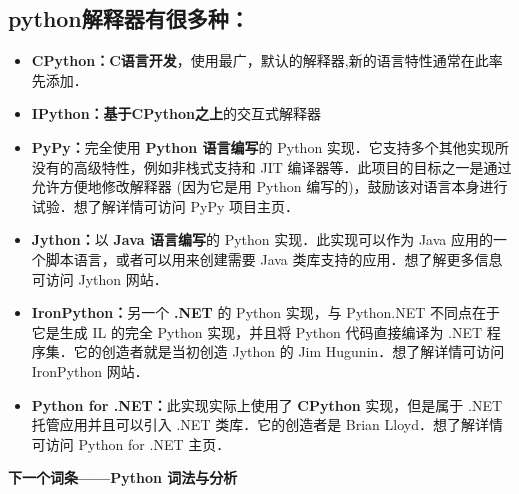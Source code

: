 \subsection{python解释器有很多种：}

\begin{itemize}
\item \textbf{CPython：}\textbf{C语言开发}，使用最广，默认的解释器,新的语言特性通常在此率先添加．

\item \textbf{IPython：}\textbf{基于CPython之上}的交互式解释器

\item \textbf{PyPy：}完全使用 \textbf{Python 语言编写}的 Python 实现．它支持多个其他实现所没有的高级特性，例如非栈式支持和 JIT 编译器等．此项目的目标之一是通过允许方便地修改解释器 (因为它是用 Python 编写的)，鼓励该对语言本身进行试验．想了解详情可访问 PyPy 项目主页．

\item \textbf{Jython：}以 \textbf{Java 语言编写}的 Python 实现．此实现可以作为 Java 应用的一个脚本语言，或者可以用来创建需要 Java 类库支持的应用．想了解更多信息可访问 Jython 网站．

\item \textbf{IronPython：}另一个 \textbf{.NET} 的 Python 实现，与 Python.NET 不同点在于它是生成 IL 的完全 Python 实现，并且将 Python 代码直接编译为 .NET 程序集．它的创造者就是当初创造 Jython 的 Jim Hugunin．想了解详情可访问 IronPython 网站．

\item \textbf{Python for .NET：}此实现实际上使用了 \textbf{CPython} 实现，但是属于 .NET 托管应用并且可以引入 .NET 类库．它的创造者是 Brian Lloyd．想了解详情可访问 Python for .NET 主页．
\end{itemize}

\textbf{下一个词条——Python 词法与分析}
